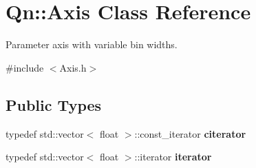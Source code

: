 \hypertarget{classQn_1_1Axis}{}\section{Qn\+:\+:Axis Class Reference}
\label{classQn_1_1Axis}


Parameter axis with variable bin widths.  




{\ttfamily \#include $<$Axis.\+h$>$}

\subsection*{Public Types}
\begin{DoxyCompactItemize}
\item 
\mbox{\label{classQn_1_1Axis_aecaef827e021f557908269e846ec953f}} 
typedef std\+::vector$<$ float $>$\+::const\+\_\+iterator {\bfseries citerator}
\item 
\mbox{\label{classQn_1_1Axis_a17ec979786a378efeb648d11be4ddbc2}} 
typedef std\+::vector$<$ float $>$\+::iterator {\bfseries iterator}
\end{DoxyCompactItemize}
